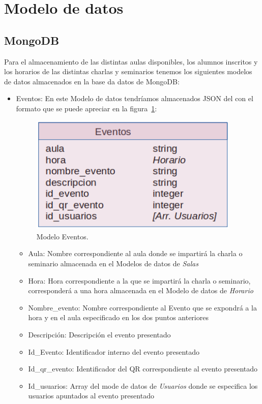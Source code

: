 \documentclass[a4paper, 12pt]{book}
\begin{document}
\clearpage

\section{Modelo de datos} 
\label{sec:modelo de datos}

\subsection{MongoDB}
	Para el almacenamiento de las distintas aulas disponibles, los alumnos inscritos y los horarios de las distintas charlas y seminarios tenemos los siguientes modelos de datos almacenados en la base da datos de MongoDB:
	
\begin{itemize}
	\item Eventos: En este Modelo de datos tendríamos almacenados JSON del con el formato que se puede apreciar en la figura~\ref{fig:mongoDBEventos}:
	\begin{figure}[h!]
  	\centering
  	\includegraphics[width=10cm, keepaspectratio]{img/mongoDBEventos.png}
  	\caption{Modelo Eventos.}\label{fig:mongoDBEventos}
	\end{figure}
		\begin{itemize}
		\item Aula: Nombre correspondiente al aula donde se impartirá la charla o seminario almacenada en el Modelos de datos de \textit{Salas}
		\item Hora: Hora correspondiente a la que se impartirá la charla o seminario, corresponderá a una hora almacenada en el Modelo de datos de \textit{Horario}
		\item Nombre\_evento: Nombre correspondiente al Evento que se expondrá a la hora y en el aula especificado en los dos puntos anteriores
		\item Descripción: Descripción el evento presentado
		\item Id\_Evento: Identificador interno del evento presentado
		\item Id\_qr\_evento: Identificador del QR correspondiente al evento presentado
		\item Id\_usuarios: Array del mode de datos de \textit{Usuarios} donde se especifica los usuarios apuntados al evento presentado
		\end{itemize}
		

\end{itemize}
\end{document}
